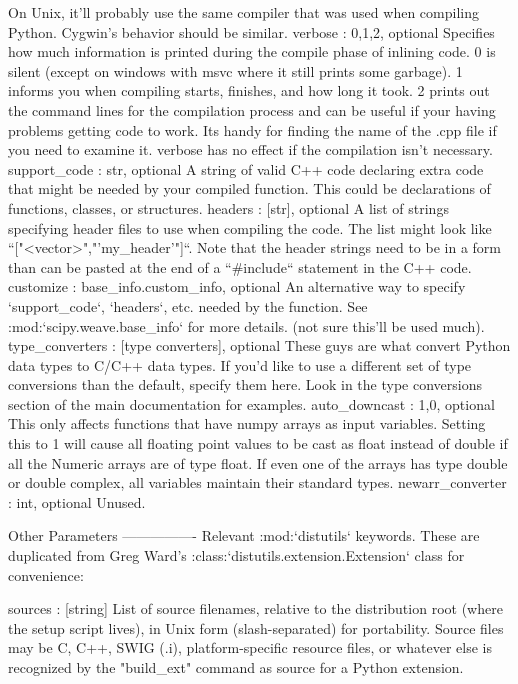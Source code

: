 \begin{DoxyVerb}
    On Unix, it'll probably use the same compiler that was used when
    compiling Python. Cygwin's behavior should be similar.
verbose : {0,1,2}, optional
    Specifies how much information is printed during the compile
    phase of inlining code.  0 is silent (except on windows with msvc
    where it still prints some garbage). 1 informs you when compiling
    starts, finishes, and how long it took.  2 prints out the command
    lines for the compilation process and can be useful if your having
    problems getting code to work.  Its handy for finding the name of
    the .cpp file if you need to examine it.  verbose has no effect if
    the compilation isn't necessary.
support_code : str, optional
    A string of valid C++ code declaring extra code that might be
    needed by your compiled function.  This could be declarations of
    functions, classes, or structures.
headers : [str], optional
    A list of strings specifying header files to use when compiling
    the code.  The list might look like ``["<vector>","'my_header'"]``.
    Note that the header strings need to be in a form than can be
    pasted at the end of a ``#include`` statement in the C++ code.
customize : base_info.custom_info, optional
    An alternative way to specify `support_code`, `headers`, etc. needed
    by the function.  See :mod:`scipy.weave.base_info` for more
    details. (not sure this'll be used much).
type_converters : [type converters], optional
    These guys are what convert Python data types to C/C++ data types.
    If you'd like to use a different set of type conversions than the
    default, specify them here. Look in the type conversions section
    of the main documentation for examples.
auto_downcast : {1,0}, optional
    This only affects functions that have numpy arrays as input
    variables.  Setting this to 1 will cause all floating point values
    to be cast as float instead of double if all the Numeric arrays
    are of type float.  If even one of the arrays has type double or
    double complex, all variables maintain their standard
    types.
newarr_converter : int, optional
    Unused.

Other Parameters
----------------
Relevant :mod:`distutils` keywords.  These are duplicated from Greg Ward's
:class:`distutils.extension.Extension` class for convenience:

sources : [string]
    List of source filenames, relative to the distribution root
    (where the setup script lives), in Unix form (slash-separated)
    for portability.  Source files may be C, C++, SWIG (.i),
    platform-specific resource files, or whatever else is recognized
    by the "build_ext" command as source for a Python extension.


\end{DoxyVerb}
